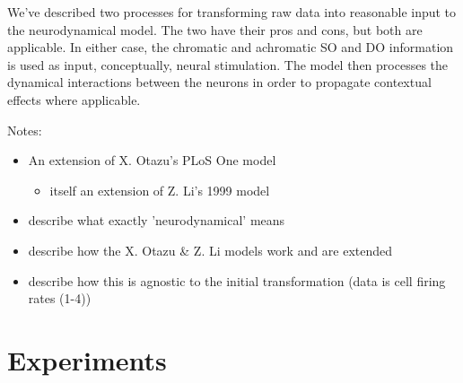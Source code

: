 \documentclass[journal,onecolumn]{IEEEtran}
\begin{document}
We've described two processes for transforming raw data into reasonable input to the neurodynamical model. The two have their pros and cons, but both are applicable. In either case, the chromatic and achromatic SO and DO information is used as input, conceptually, neural stimulation. The model then processes the dynamical interactions between the neurons in order to propagate contextual effects where applicable.

Notes:
\begin{itemize}
    \item An extension of X. Otazu's PLoS One model
    \begin{itemize}
        \item itself an extension of Z. Li's 1999 model
    \end{itemize}
    \item describe what exactly 'neurodynamical' means
    \item describe how the X. Otazu \& Z. Li models work and are extended
    \item describe how this is agnostic to the initial transformation (data is cell firing rates (1-4))
\end{itemize}


%
%
%
\section{Experiments}
\end{document}
